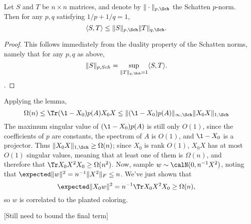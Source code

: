 \begin{lemma}
	Let $S$ and $T$ be $n\times n$ matrices, and denote by $\|\cdot\|_{p,\Sch}$ the Schatten $p$-norm. Then for any  $p,q$ satisfying $1/p + 1/q = 1$,
	\[
		\langle S,T \rangle \le \|S\|_{p,\Sch}\|T\|_{q,\Sch}.
	\]
\end{lemma}

\begin{proof}
	This follows immediately from the duality property of the Schatten norms, namely that for any $p,q$ as above,
	\[
		\|S\|_{p,Sch} = \sup_{\|T\|_{q,\Sch} = 1} \langle S,T \rangle.
	\].
\end{proof}

Applying the lemma,
\[
	\Omega(n) \le \Tr (\1 - X_0)p(A)X_0 X \le \|(\1 - X_0)p(A)\|_{\infty,\Sch}\|X_0 X\|_{1,\Sch}
\]
The maximum singular value of $(\1 - X_0)p(A)$ is still only $O(1)$, since the coefficients of $p$ are constants, the spectrom of $A$ is $O(1)$, and $\1 - X_0$ is a projector. Thus $\|X_0X\|_{1,\Sch} \ge \Omega(n)$; since $X_0$ is rank $O(1)$, $X_0 X$ has at most $O(1)$ singular values, meaning that at least one of them is $\Omega(n)$, and therefore that $\Tr X_0 X^2 X_0 \ge \Omega(n^2)$. Now, sample $w \sim \calN(0,n^{-1}X^2)$, noting that $\expected\|w\|^2 = n^{-1}\|X^2\|_F \le n$. We've just shown that
\[
	\expected\|X_0w\|^2 = n^{-1} \Tr X_0 X^2 X_0 \ge \Omega(n),
\]
so $w$ is correlated to the planted coloring.

[Still need to bound the final term]

